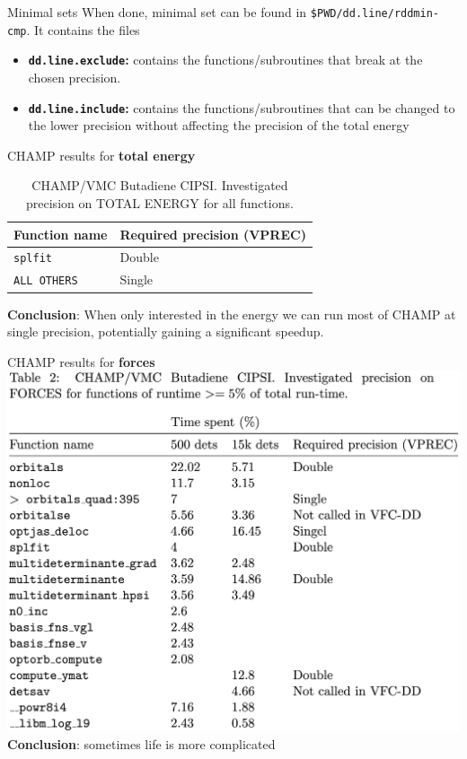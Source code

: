 \documentclass[aspectratio=169]{beamer}
\begin{document}
    \begin{frame}{Minimal sets}
      When done, minimal set can be found in \texttt{\$PWD/dd.line/rddmin-cmp}. It contains the files
      \begin{itemize}
        \item \textbf{\texttt{dd.line.exclude}:} contains the functions/subroutines that break at the chosen precision. 
        \item \textbf{\texttt{dd.line.include}:} contains the functions/subroutines that can be changed to the lower precision without affecting the precision of the total energy
      \end{itemize}
    \end{frame}
      
    \begin{frame}{CHAMP results for \textbf{total energy}}
      \begin{table}[h]
\caption{CHAMP/VMC Butadiene CIPSI. Investigated precision on TOTAL ENERGY for all functions.}
\label{table:te}
\begin{tabular}{@{}ll@{}}
                  \\ \midrule
Function name                          & Required precision (VPREC) \\ \midrule
\texttt{splfit}                        & Double                              \\
\texttt{ALL OTHERS}                    & Single                         \\

\end{tabular}
\end{table}
\textbf{Conclusion}: When only interested in the energy we can run most of CHAMP at single precision, potentially gaining a significant speedup. 

    \end{frame}

    \begin{frame}{CHAMP results for \textbf{forces}}
      \centering
      \includegraphics[width=0.5\linewidth]{forces.png}\\
      \textbf{Conclusion}: sometimes life is more complicated
    \end{frame}
    
\end{document}
